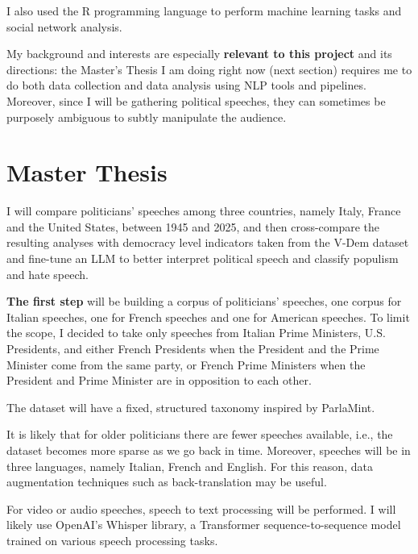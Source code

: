 \documentclass[12pt,a4paper,sans]{moderncv} %
\begin{document}
I also used the R programming language to perform machine learning tasks and social network analysis.

\vspace{2mm}

My background and interests are especially \textbf{relevant to this project} and its directions: the Master's Thesis I am doing right now (next section) requires me to do both data collection and data analysis using NLP tools and pipelines. Moreover, since I will be gathering political speeches, they can sometimes be purposely ambiguous to subtly manipulate the audience.


\section{Master Thesis}

I will compare politicians' speeches among three countries, namely Italy, France and the United States, between 1945 and 2025, and then cross-compare the resulting analyses with democracy level indicators taken from the V-Dem dataset and fine-tune an LLM to better interpret political speech and classify populism and hate speech.

\vspace{2mm}

\textbf{The first step} will be building a corpus of politicians' speeches, one corpus for Italian speeches, one for French speeches and one for American speeches. To limit the scope, I decided to take only speeches from Italian Prime Ministers, U.S. Presidents, and either French Presidents when the President and the Prime Minister come from the same party, or French Prime Ministers when the President and Prime Minister are in opposition to each other. 

The dataset will have a fixed, structured taxonomy inspired by ParlaMint.

It is likely that for older politicians there are fewer speeches available, i.e., the dataset becomes more sparse as we go back in time. Moreover, speeches will be in three languages, namely Italian, French and English. For this reason, data augmentation techniques such as back-translation may be useful.

For video or audio speeches, speech to text processing will be performed. I will likely use OpenAI's Whisper library, a Transformer sequence-to-sequence model trained on various speech processing tasks. 
\end{document}
